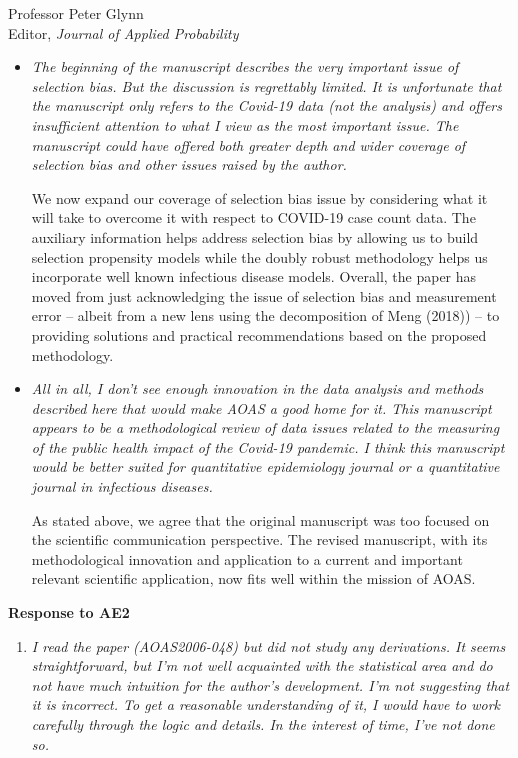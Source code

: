 \documentclass[11pt]{letter} %
\begin{document}
\begin{letter}{Professor
	Peter Glynn\\
	Editor, {\em Journal of Applied Probability}}
\begin{itemize}
\item {\it The beginning of the manuscript describes the very important issue of selection bias.  But the discussion is regrettably limited.  It is unfortunate that the manuscript only refers to the Covid-19 data (not the analysis) and offers insufficient attention to what I view as the most important issue.  The manuscript could have offered both greater depth and wider coverage of selection bias and other issues raised by the author.}

\vspace{5mm}
We now expand our coverage of selection bias issue by considering what it will take to overcome it with respect to COVID-19 case count data.  The auxiliary information helps address selection bias by allowing us to build selection propensity models while the doubly robust methodology helps us incorporate well known infectious disease models.  Overall, the paper has moved from just acknowledging the issue of selection bias and measurement error -- albeit from a new lens using the decomposition of Meng (2018)) -- to providing solutions and practical recommendations based on the proposed methodology.
\vspace{5mm}

\item {\it All in all, I don't see enough innovation in the data analysis and methods described here that would make AOAS a good home for it.  This manuscript appears to be a methodological review of data issues related to the measuring of the public health impact of the Covid-19 pandemic. I think this manuscript would be better suited for quantitative epidemiology journal or a quantitative journal in infectious diseases.}

\vspace{5mm}
As stated above, we agree that the original manuscript was too focused on the scientific communication perspective.  The revised manuscript, with its methodological innovation and application to a current and important relevant scientific application, now fits well within the mission of AOAS.
\vspace{5mm}


\end{itemize}

\newpage

{\bf Response to AE2}
\begin{enumerate}
\item {\it I read the paper (AOAS2006-048) but did not study any derivations. It seems straightforward, but I'm not well acquainted with the statistical area and do not have much intuition for the author's development. I'm not suggesting that it is incorrect. To get a reasonable understanding of it, I would have to work carefully through the logic and details.  In the interest of time, I've not done so.}


\end{enumerate}
\end{letter}
\end{document}
